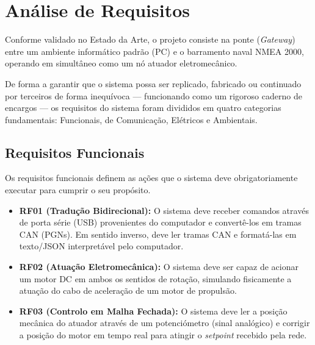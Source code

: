 \chapter{Análise de Requisitos}
\label{chap:requisitos}

Conforme validado no Estado da Arte, o projeto consiste na ponte (\textit{Gateway}) entre um ambiente informático padrão (PC) e o barramento naval NMEA 2000, operando em simultâneo como um nó atuador eletromecânico. 

De forma a garantir que o sistema possa ser replicado, fabricado ou continuado por terceiros de forma inequívoca --- funcionando como um rigoroso caderno de encargos --- os requisitos do sistema foram divididos em quatro categorias fundamentais: Funcionais, de Comunicação, Elétricos e Ambientais.

\section{Requisitos Funcionais}
Os requisitos funcionais definem as ações que o sistema deve obrigatoriamente executar para cumprir o seu propósito.
\begin{itemize}
    \item \textbf{RF01 (Tradução Bidirecional):} O sistema deve receber comandos através de porta série (USB) provenientes do computador e convertê-los em tramas CAN (PGNs). Em sentido inverso, deve ler tramas CAN e formatá-las em texto/JSON interpretável pelo computador.
    \item \textbf{RF02 (Atuação Eletromecânica):} O sistema deve ser capaz de acionar um motor DC em ambos os sentidos de rotação, simulando fisicamente a atuação do cabo de aceleração de um motor de propulsão.
    \item \textbf{RF03 (Controlo em Malha Fechada):} O sistema deve ler a posição mecânica do atuador através de um potenciómetro (sinal analógico) e corrigir a posição do motor em tempo real para atingir o \textit{setpoint} recebido pela rede.
\end{itemize}

